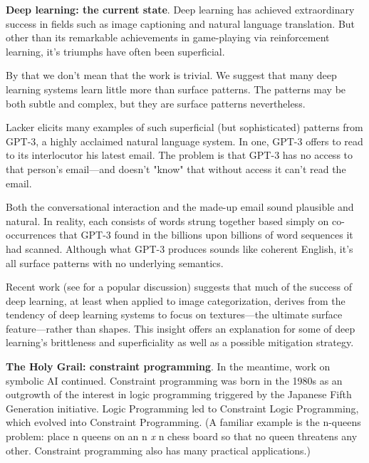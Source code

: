 \smallv\noindent\textbf{Deep learning: the current state}. Deep learning has achieved extraordinary success in fields such as image captioning and natural language translation.\cite{garnelo2019reconciling} But other than its remarkable achievements in game-playing via reinforcement learning\cite{silver2018general}, it's triumphs have often been superficial. 

By that we don't mean that the work is trivial. We suggest that many deep learning systems learn little more than surface patterns. The patterns may be both subtle and complex, but they are surface patterns nevertheless.

Lacker\cite{lacker-gpt3} elicits many examples of such superficial (but sophisticated) patterns from GPT-3\cite{brown2020language}, a highly acclaimed natural language system. In one, GPT-3 offers to read to its interlocutor his latest email. The problem is that GPT-3 has no access to that person's email---and doesn't "know" that without access it can't read the email. %

Both the conversational interaction and the made-up email sound plausible and natural. In reality, each consists of words strung together based simply on co-occurrences that GPT-3 found in the billions upon billions of word sequences it had scanned. Although what GPT-3 produces sounds like coherent English, it's all surface patterns with no underlying semantics.

Recent work\cite{geirhos2018imagenet} (see \cite{Cepelewicz-textures-2020} for a popular discussion) suggests that much of the success of deep learning, at least when applied to image categorization, derives from the tendency of deep learning systems to focus on textures---the ultimate surface feature---rather than shapes.  This insight offers an explanation for some of deep learning's brittleness and superficiality as well as a possible mitigation strategy.

\smallv\noindent\textbf{The Holy Grail: constraint programming}. In the meantime, work on symbolic AI continued. Constraint programming was born in the 1980s as an outgrowth of the interest in logic programming triggered by the Japanese Fifth Generation initiative.\cite{shapiro1983fifth} Logic Programming led to Constraint Logic Programming, which evolved into Constraint Programming. (A familiar example is the n-queens problem: place n queens on an n \textit{x} n chess board so that no queen threatens any other. Constraint programming also has many practical  applications.)

